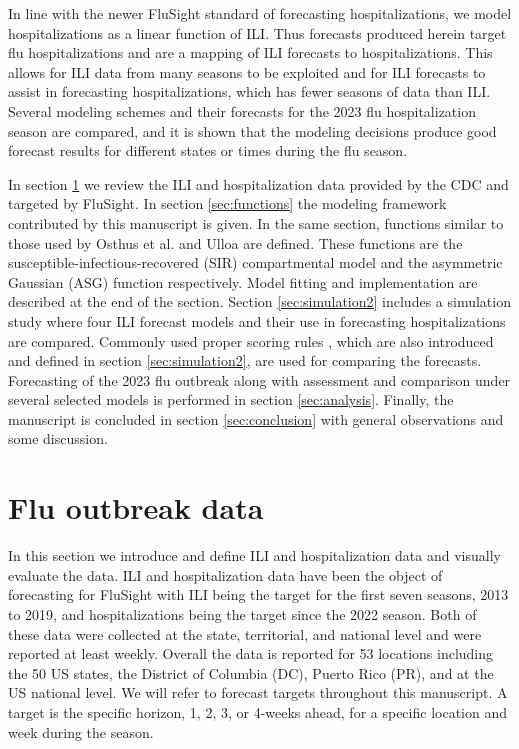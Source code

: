 In line with the newer FluSight standard of forecasting hospitalizations, we 
model hospitalizations as a linear function of ILI. Thus forecasts produced 
herein target flu hospitalizations and are a mapping of ILI forecasts to 
hospitalizations. This allows for ILI data from many seasons to be exploited 
and for ILI forecasts to assist in forecasting hospitalizations, which has 
fewer seasons of data than ILI. Several modeling schemes and their forecasts 
for the 2023 flu hospitalization season are compared, and it is shown that the 
modeling decisions produce good forecast results for different states or times 
during the flu season.

In section \ref{sec:data} we review the ILI and hospitalization data provided 
by the CDC and targeted by FluSight. 
In section \ref{sec:functions} the modeling framework contributed by this 
manuscript is given. In the same section, functions similar to those used by 
Osthus et al. \cite[]{osthus2019dynamic} and Ulloa \cite[]{ulloa2019} are 
defined.
 These functions are the susceptible-infectious-recovered (SIR) compartmental 
 model and the asymmetric Gaussian (ASG) function  respectively. Model fitting 
 and implementation are described at the end of the section. Section 
 \ref{sec:simulation2} includes a simulation study where four ILI forecast 
 models and their use in forecasting hospitalizations are compared. Commonly 
 used proper scoring rules \cite[]{gneiting2007strictly}, which are also 
 introduced and defined in section \ref{sec:simulation2}, are used for 
 comparing the forecasts. Forecasting of the 2023 flu outbreak along with 
 assessment and comparison under several selected models is performed in 
 section \ref{sec:analysis}. 
 Finally, the manuscript is concluded in section \ref{sec:conclusion} with 
 general observations and some discussion.
 
 
 
 
 
 
 
 
 
 
 
 
 \section{Flu outbreak data} \label{sec:data}
In this section we introduce and define ILI and hospitalization data and 
visually evaluate the data. ILI and hospitalization data have been the object 
of forecasting for FluSight with ILI being the target for the first seven
seasons, 2013 to 2019, and hospitalizations being the target since the 
2022 season. Both of 
these data were collected at the state, territorial, and national level and 
were reported at least weekly. Overall the data is reported for 53 locations 
including the 50 US states, the District of Columbia (DC), Puerto Rico (PR), 
and at the US national level. We will refer to forecast targets throughout this 
manuscript. A target is the specific horizon, 1, 2, 3, or 4-weeks ahead, for a 
specific location and week during the season.  

